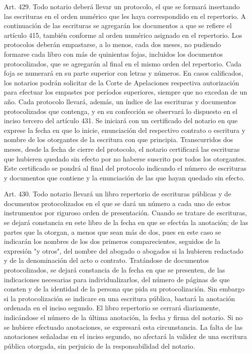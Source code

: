     Art. 429. Todo notario deberá llevar un protocolo, el que se formará insertando las escrituras en el orden numérico que les haya correspondido en el repertorio.
    A continuación de las escrituras se agregarán los documentos a que se refiere el artículo 415, también conforme al orden numérico asignado en el repertorio.
    Los protocolos deberán empastarse, a lo menos, cada dos meses, no pudiendo formarse cada libro con más de quinientas fojas, incluidos los documentos protocolizados, que se agregarán al final en el mismo orden del repertorio. Cada foja se numerará en su parte superior con letras y números.
    En casos calificados, los notarios podrán solicitar de la Corte de Apelaciones respectiva autorización para efectuar los empastes por períodos superiores, siempre que no excedan de un año.
    Cada protocolo llevará, además, un índice de las escrituras y documentos protocolizados que contenga, y en su confección se observará lo dispuesto en el inciso tercero del artículo 431. Se iniciará con un certificado del notario en que exprese la fecha en que lo inicie, enunciación del respectivo contrato o escritura y nombre de los otorgantes de la escritura con que principia.
    Transcurridos dos meses, desde la fecha de cierre del protocolo, el notario certificará las escrituras que hubieren quedado sin efecto por no haberse suscrito por todos los otorgantes. Este certificado se pondrá al final del protocolo indicando el número de escrituras y documentos que contiene y la enunciación de las que hayan quedado sin efecto.


    Art. 430. Todo notario llevará un libro repertorio de escrituras públicas y de documentos protocolizados en el que se dará un número a cada uno de estos instrumentos por riguroso orden de presentación.
    Cuando se tratare de escrituras, se dejará constancia en este libro de la fecha en que se efectúa la anotación; de las partes que la otorgan, a menos que sean más de dos, pues en este caso se indicarán los nombres de los dos primeros comparecientes, seguidos de la expresión "y otros", del nombre del abogado o abogados si la hubieren redactado y de la denominación del acto o contrato.
    Tratándose de documentos protocolizados, se dejará constancia de la fecha en que se presenten, de las indicaciones necesarias para individualizarlos, del número de páginas de que consten y de la identidad de la persona que pida su protocolización.
    Sin embargo si la protocolización se indicare en una escritura pública, bastará la anotación ordenada en el inciso segundo.
    El libro repertorio se cerrará diariamente, indicándose el número de la última anotación, la fecha y firma del notario. Si no se hubiere efectuado anotaciones, se expresará esta circunstancia.
    La falta de las anotaciones señaladas en el inciso segundo, no afectará la validez de una escritura pública otorgada, sin perjuicio de la responsabilidad del notario.

